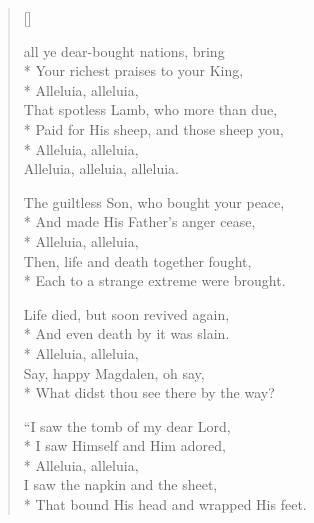 \newHymn
{}

\begin{verse}[\versewidth]
\begin{patverse}
 all ye dear-bought nations, bring \\*
Your richest praises to your King,\\*
Alleluia, alleluia,                 \\
That spotless Lamb, who more than due, \\*        
Paid for His sheep, and those sheep you,  \\*     
Alleluia, alleluia,\\ 
Alleluia, alleluia, alleluia.
\end{patverse}

\begin{patverse}
 The guiltless Son, who bought your peace,       \\*                                  
And made His Father's anger cease,\\*
Alleluia, alleluia,                  \\
Then, life and death together fought,   \\*       
Each to a strange extreme were brought.        
\end{patverse}

\begin{patverse}
 Life died, but soon revived again, \\* 
And even death by it was slain.                \\*
Alleluia, alleluia,                            \\
Say, happy Magdalen, oh say,                  \\*
What didst thou see there by the way?      
\end{patverse}

\begin{patverse}
 ``I saw the tomb of my dear Lord,            \\*
I saw Himself and Him adored,                  \\*
Alleluia, alleluia,                            \\
I saw the napkin and the sheet,                \\*
That bound His head and wrapped His feet. 
\end{patverse}


\end{verse}
